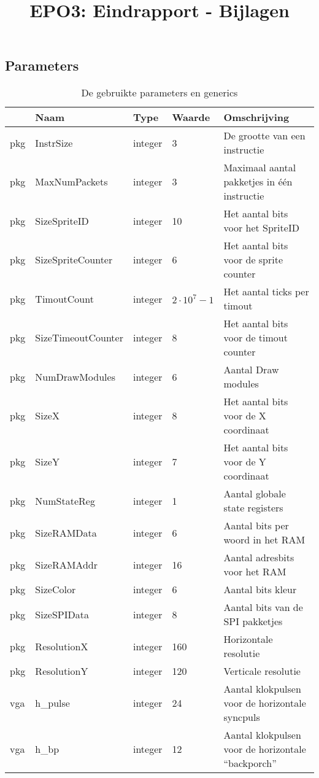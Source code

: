 \documentclass{scrreprt}
\author{}
\title{EPO3: Eindrapport - Bijlagen}
\begin{document}
\begin{appendices}

\chapter{Parameters}
\label{app:parameters}
\begin{table}[H]
	\centering
	\caption{De gebruikte parameters en generics}
	\label{tab:spec-params}
	\begin{tabular}{l l l l l}
		\hline\hline
	 	 & Naam & Type & Waarde & Omschrijving\\
	 	\hline
		pkg & InstrSize & integer & 3 & De grootte van een instructie\\ 
		pkg & MaxNumPackets & integer & 3 & Maximaal aantal pakketjes in één instructie\\ 
		pkg & SizeSpriteID & integer & 10 & Het aantal bits voor het SpriteID \\
		pkg & SizeSpriteCounter & integer & 6 & Het aantal bits voor de sprite counter\\
		pkg & TimoutCount & integer & $2\cdot10^{7}-1$ & Het aantal ticks per timout\\
		pkg & SizeTimeoutCounter & integer & 8 & Het aantal bits voor de timout counter\\
		pkg & NumDrawModules & integer & 6 & Aantal Draw modules\\ 
		pkg & SizeX & integer & 8 & Het aantal bits voor de X coordinaat\\
		pkg & SizeY & integer & 7 & Het aantal bits voor de Y coordinaat\\
		pkg & NumStateReg & integer & 1 & Aantal globale state registers\\
		pkg & SizeRAMData & integer & 6 & Aantal bits per woord in het RAM\\
		pkg & SizeRAMAddr & integer & 16 & Aantal adresbits voor het RAM\\
		pkg & SizeColor & integer & 6 & Aantal bits kleur\\
		pkg & SizeSPIData & integer & 8 & Aantal bits van de SPI pakketjes\\
		pkg & ResolutionX & integer & 160 & Horizontale resolutie \\
		pkg & ResolutionY & integer & 120 & Verticale resolutie \\
		vga & h\_pulse & integer & 24 & Aantal klokpulsen voor de horizontale syncpuls\\ 
		vga & h\_bp & integer & 12 & Aantal klokpulsen voor de horizontale “backporch” \\ 

\end{tabular}
\end{table}
\end{appendices}
\end{document}
